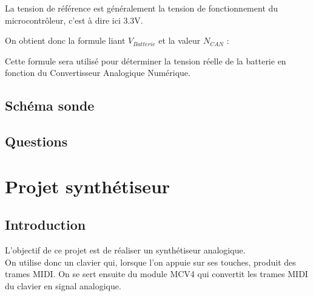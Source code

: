  La tension de référence est généralement la tension de fonctionnement du microcontrôleur, c'est à dire ici 3.3V.

 On obtient donc la formule liant $V_{Batterie}$ et la valeur $N_{CAN}$ :



 Cette formule sera utilisé pour déterminer la tension réelle de la batterie en fonction du Convertisseur Analogique Numérique.




 \chapter{Schéma sonde}



 \chapter{Questions}


 
 
\part{Projet synthétiseur}
\chapter{Introduction}

L’objectif de ce projet est de réaliser un synthétiseur analogique.\\
On utilise donc un clavier qui, lorsque l’on appuie sur ses touches, produit des trames MIDI. 
On se sert ensuite du module MCV4 qui convertit les trames MIDI du clavier en signal analogique.\\

